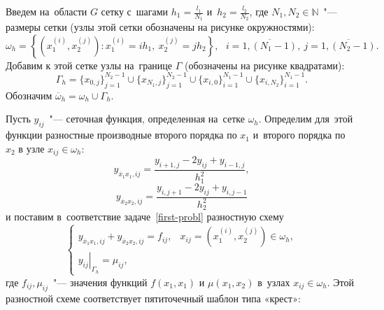 \documentclass[11pt,a4paper,twoside,listtotoc,bibtotoc]{report}
\numberwithin{equation}{section}
\theoremstyle{definition}
\theoremstyle{plain}
\begin{document}
Введем на~области $G$ сетку с~шагами $h_1=\frac{l_1}{N_1}$
и~$h_2=\frac{l_2}{N_2}$, где $N_1,N_2\in\mathbb{N}$~"--- размеры сетки
(узлы этой сетки обозначены на рисунке окружностями):
%
$$
    \omega_h = \left\{\left(x_1^{(i)}, x_2^{(j)}\right):
        x_1^{(i)}=ih_1,~x_2^{(j)} = jh_2
    \right\},~~~i=\overline{1,(N_1-1)},~j=\overline{1,(N_2-1)}.
$$
%
Добавим к этой сетке узлы на~границе $\Gamma$ (обозначены на рисунке квадратами):
%
$$
    \Gamma_h = \{x_{0,j}\}_{j=1}^{N_2-1} \cup \{x_{N_1,j}\}_{j=1}^{N_2-1} \cup
        \{x_{i,0}\}_{i=1}^{N_1-1} \cup \{x_{i,N_2}\}_{i=1}^{N_1-1}.
$$
%
Обозначим $\overline{\omega}_h = \omega_h\cup\Gamma_h$.
\vspace{1em}
\begin{figure}[H]
\centering
{}
\end{figure}
\vspace{1em}

Пусть $y_{ij}$~"--- сеточная функция, определенная на~сетке $\omega_h$.
Определим для~этой функции разностные производные второго порядка по $x_1$
и~второго порядка по~$x_2$ в узле $x_{ij}\in\omega_h$:
%
$$
    y_{\overline{x}_1x_1,ij}
    = \frac{y_{i+1,j} - 2y_{ij} + y_{i-1,j}}{h_1^2},
$$
%
%
$$
    y_{\overline{x}_2x_2,ij}
    = \frac{y_{i,j+1} - 2y_{ij} + y_{i,j-1}}{h_2^2}
$$
%
и поставим в~соответствие задаче~\eqref{first-probl} разностную схему
%
\begin{equation}
    \label{eq:ION}
    \begin{cases}
        y_{\overline{x}_1x_1,ij}+y_{\overline{x}_2x_2,ij}=f_{ij}, &
            x_{ij} = \left(x_1^{(i)}, x_2^{(j)}\right) \in \omega_h,\\
        \left.y_{ij}\right\vert_{\Gamma_h} = \mu_{ij}, &
    \end{cases}
\end{equation}
%
где $f_{ij}, \mu_{ij}$~"--- значения функций
$f(x_1, x_1)$ и $\mu(x_1,x_2)$ в~узлах $x_{ij}\in\omega_h$.
Этой разностной схеме соответствует пятиточечный шаблон типа «крест»:
\end{document}
